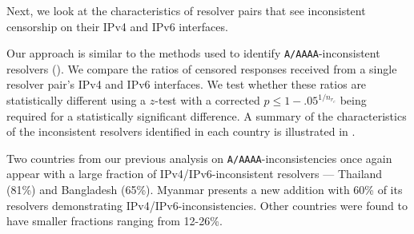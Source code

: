 Next, we look at the characteristics of resolver pairs that see inconsistent
censorship on their IPv4 and IPv6 interfaces. 

%
 Our approach is similar to
the methods used to identify {\tt A/AAAA}-inconsistent resolvers
(\cf {}). 
%
We compare the ratios of censored responses received from a single resolver
pair's IPv4 and IPv6 interfaces. We test whether these ratios are statistically
different using a $z$-test with a \Sidak corrected $p \leq 1-.05^{1/n_{r_c}}$
being required for a statistically significant difference. 
%
A summary of the characteristics of the inconsistent resolvers identified in
each country is illustrated in .

%
Two countries from our previous analysis on {\tt A/AAAA}-inconsistencies once
again appear with a large fraction of IPv4/IPv6-inconsistent resolvers ---
Thailand (81\%) and Bangladesh (65\%). Myanmar presents a new addition with
60\% of its resolvers demonstrating IPv4/IPv6-inconsistencies. Other countries
were found to have smaller fractions ranging from 12-26\%.

